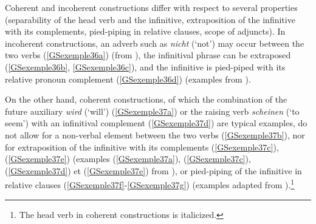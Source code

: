 \documentclass[output=paper
	        ,collection
	        ,collectionchapter
 	        ,biblatex
                ,babelshorthands
                ,newtxmath
                ,draftmode
                ,colorlinks, citecolor=brown
]{langscibook}
\begin{document}
{Coherent and incoherent constructions differ with respect to several properties (separability of the head verb and the infinitive, extraposition of the infinitive with its complements, pied-piping in relative clauses, scope of adjuncts). In incoherent constructions, an adverb such as \emph{nicht} (`not') may occur between the two verbs (\ref{GSexemple36a}) (from \citealt[42]{Mueller2002b}), the infinitival phrase can be extraposed (\ref{GSexemple36b}, \ref{GSexemple36c}), and the infinitive is pied-piped with its relative pronoun complement (\ref{GSexemple36d}) (examples from \citealt[117-118]{HN98a}).

\eal
	\label{GSexemple36} 
	\label{GSexemple36a}

    \label{GSexemple36b}

	\label{GSexemple36c}	
		
	\label{GSexemple36d}
\zl

On the other hand, coherent constructions, of which the combination of the future auxiliary \emph{wird} (`will') (\ref{GSexemple37a}) or the raising verb \emph{scheinen} (`to seem’) with an infinitival complement (\ref{GSexemple37d}) are typical examples, do not allow for a non-verbal element between the two verbs (\ref{GSexemple37b}), nor for extraposition of the infinitive with its complements (\ref{GSexemple37c}), (\ref{GSexemple37e}) (examples (\ref{GSexemple37a}), (\ref{GSexemple37c}), (\ref{GSexemple37d}) et (\ref{GSexemple37e}) from \citealt[43]{Mueller2002b}), or pied-piping of the infinitive in relative clauses (\ref{GSexemple37f}-\ref{GSexemple37g}) (examples adapted from \citealt[66]{HN99d}).\footnote{The head verb in coherent constructions is italicized.}    

}
\end{document}
